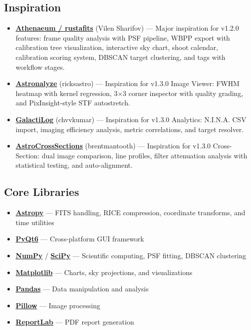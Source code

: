 \documentclass[11pt,a4paper]{article}
\begin{document}
\subsection{Inspiration}

\begin{itemize}
    \item \textbf{\href{https://github.com/eg013ra1n/rustafits}{Athenaeum / rustafits}} (Vilen Sharifov) --- Major inspiration for v1.2.0 features: frame quality analysis with PSF pipeline, WBPP export with calibration tree visualization, interactive sky chart, shoot calendar, calibration scoring system, DBSCAN target clustering, and tags with workflow stages.
    \item \textbf{\href{https://github.com/ricksastro/Astronalyze}{Astronalyze}} (ricksastro) --- Inspiration for v1.3.0 Image Viewer: FWHM heatmap with kernel regression, 3$\times$3 corner inspector with quality grading, and PixInsight-style STF autostretch.
    \item \textbf{\href{https://github.com/chvvkumar/GalactiLog}{GalactiLog}} (chvvkumar) --- Inspiration for v1.3.0 Analytics: N.I.N.A. CSV import, imaging efficiency analysis, metric correlations, and target resolver.
    \item \textbf{\href{https://github.com/brentmantooth/AstroCrossSections}{AstroCrossSections}} (brentmantooth) --- Inspiration for v1.3.0 Cross-Section: dual image comparison, line profiles, filter attenuation analysis with statistical testing, and auto-alignment.
\end{itemize}

\subsection{Core Libraries}

\begin{itemize}
    \item \textbf{\href{https://www.astropy.org/}{Astropy}} --- FITS handling, RICE compression, coordinate transforms, and time utilities
    \item \textbf{\href{https://www.riverbankcomputing.com/software/pyqt/}{PyQt6}} --- Cross-platform GUI framework
    \item \textbf{\href{https://numpy.org/}{NumPy}} / \textbf{\href{https://scipy.org/}{SciPy}} --- Scientific computing, PSF fitting, DBSCAN clustering
    \item \textbf{\href{https://matplotlib.org/}{Matplotlib}} --- Charts, sky projections, and visualizations
    \item \textbf{\href{https://pandas.pydata.org/}{Pandas}} --- Data manipulation and analysis
    \item \textbf{\href{https://pillow.readthedocs.io/}{Pillow}} --- Image processing
    \item \textbf{\href{https://www.reportlab.com/}{ReportLab}} --- PDF report generation
\end{itemize}
\end{document}
